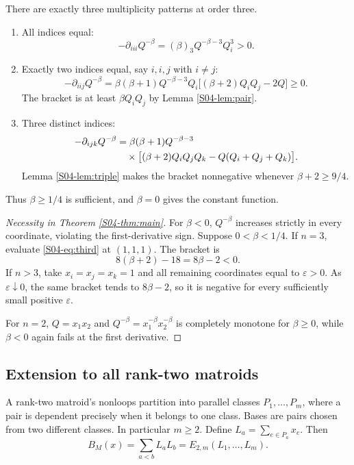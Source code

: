 \documentclass[11pt,a4paper]{article}
\theoremstyle{definition}\newtheorem{definition}[theorem]{Definition}
\theoremstyle{remark}\newtheorem{remark}[theorem]{Remark}
\numberwithin{equation}{section}
\begin{document}
There are exactly three multiplicity patterns at order three.
\begin{enumerate}[label=(\roman*)]
 \item All indices equal:
 \[
 -\partial_{iii}Q^{-\beta}=(\beta)_3Q^{-\beta-3}Q_i^3>0.
 \]
 \item Exactly two indices equal, say $i,i,j$ with $i\ne j$:
 \[
 -\partial_{iij}Q^{-\beta}
 =\beta(\beta+1)Q^{-\beta-3}Q_i
 \big[(\beta+2)Q_iQ_j-2Q\big]\ge0.
 \]
 The bracket is at least $\beta Q_iQ_j$ by Lemma \ref{S04-lem:pair}.
 \item Three distinct indices:
 \begin{align}\label{S04-eq:third}
 -\partial_{ijk}Q^{-\beta}
 &=\beta(\beta+1)Q^{-\beta-3}\notag\\
 &\quad\times\big[(\beta+2)Q_iQ_jQ_k-Q(Q_i+Q_j+Q_k)\big].
 \end{align}
 Lemma \ref{S04-lem:triple} makes the bracket nonnegative whenever $\beta+2\ge9/4$.
\end{enumerate}
Thus $\beta\ge1/4$ is sufficient, and $\beta=0$ gives the constant function.

\begin{proof}[Necessity in Theorem \ref{S04-thm:main}]
For $\beta<0$, $Q^{-\beta}$ increases strictly in every coordinate, violating the first-derivative sign. Suppose $0<\beta<1/4$. If $n=3$, evaluate \eqref{S04-eq:third} at $(1,1,1)$. The bracket is
\[
 8(\beta+2)-18=8\beta-2<0.
\]
If $n>3$, take $x_i=x_j=x_k=1$ and all remaining coordinates equal to $\varepsilon>0$. As $\varepsilon\downarrow0$, the same bracket tends to $8\beta-2$, so it is negative for every sufficiently small positive $\varepsilon$.

For $n=2$, $Q=x_1x_2$ and $Q^{-\beta}=x_1^{-\beta}x_2^{-\beta}$ is completely monotone for $\beta\ge0$, while $\beta<0$ again fails at the first derivative.
\end{proof}

\subsection{Extension to all rank-two matroids}\label{S04-sec-4}
A rank-two matroid's nonloops partition into parallel classes $P_1,\ldots,P_m$, where a pair is dependent precisely when it belongs to one class. Bases are pairs chosen from two different classes. In particular $m\ge2$. Define $L_a=\sum_{e\in P_a}x_e$. Then
\begin{equation}\label{S04-eq:matroid}
 B_M(x)=\sum_{a<b}L_aL_b=E_{2,m}(L_1,\ldots,L_m).
\end{equation}
\end{document}
